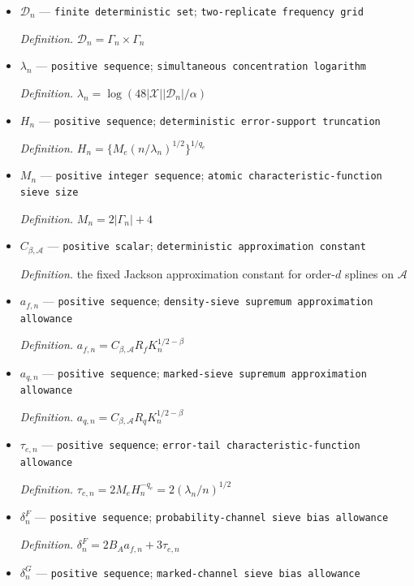 \documentclass{article}
\begin{document}
\begin{itemize}
  \item \(\mathcal D_n\) --- \texttt{finite deterministic set}; \texttt{two-\allowbreak{}replicate frequency grid}
  \par\smallskip\noindent\emph{Definition.} \(\mathcal D_n=\Gamma_n\times\Gamma_n\)
  \item \(\lambda_n\) --- \texttt{positive sequence}; \texttt{simultaneous concentration logarithm}
  \par\smallskip\noindent\emph{Definition.} \(\lambda_n=\log(48|\mathcal X||\mathcal D_n|/\alpha)\)
  \item \(H_n\) --- \texttt{positive sequence}; \texttt{deterministic error-\allowbreak{}support truncation}
  \par\smallskip\noindent\emph{Definition.} \(H_n=\{M_e(n/\lambda_n)^{1/2}\}^{1/q_e}\)
  \item \(M_n\) --- \texttt{positive integer sequence}; \texttt{atomic characteristic-\allowbreak{}function sieve size}
  \par\smallskip\noindent\emph{Definition.} \(M_n=2|\Gamma_n|+4\)
  \item \(C_{\beta,\mathcal A}\) --- \texttt{positive scalar}; \texttt{deterministic approximation constant}
  \par\smallskip\noindent\emph{Definition.} the fixed Jackson approximation constant for order-\(d\) splines on \(\mathcal A\)
  \item \(a_{f,n}\) --- \texttt{positive sequence}; \texttt{density-\allowbreak{}sieve supremum approximation allowance}
  \par\smallskip\noindent\emph{Definition.} \(a_{f,n}=C_{\beta,\mathcal A}R_fK_n^{1/2-\beta}\)
  \item \(a_{q,n}\) --- \texttt{positive sequence}; \texttt{marked-\allowbreak{}sieve supremum approximation allowance}
  \par\smallskip\noindent\emph{Definition.} \(a_{q,n}=C_{\beta,\mathcal A}R_qK_n^{1/2-\beta}\)
  \item \(\tau_{e,n}\) --- \texttt{positive sequence}; \texttt{error-\allowbreak{}tail characteristic-\allowbreak{}function allowance}
  \par\smallskip\noindent\emph{Definition.} \(\tau_{e,n}=2M_eH_n^{-q_e}=2(\lambda_n/n)^{1/2}\)
  \item \(\delta^F_n\) --- \texttt{positive sequence}; \texttt{probability-\allowbreak{}channel sieve bias allowance}
  \par\smallskip\noindent\emph{Definition.} \(\delta^F_n=2B_Aa_{f,n}+3\tau_{e,n}\)
  \item \(\delta^G_n\) --- \texttt{positive sequence}; \texttt{marked-\allowbreak{}channel sieve bias allowance}

\end{itemize}
\end{document}
